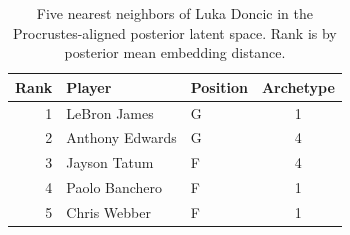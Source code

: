 \begin{table}[htbp]
  \centering\small
  \begin{tabular}{rllc}
    \toprule
    Rank & Player & Position & Archetype \\
    \midrule
    1 & LeBron James & G & 1 \\
    2 & Anthony Edwards & G & 4 \\
    3 & Jayson Tatum & F & 4 \\
    4 & Paolo Banchero & F & 1 \\
    5 & Chris Webber & F & 1 \\
    \bottomrule
  \end{tabular}
  \caption{Five nearest neighbors of Luka Doncic in the Procrustes-aligned posterior latent space. Rank is by posterior mean embedding distance.}
  \label{tab:Luka_Doncic_neighbors}
\end{table}

